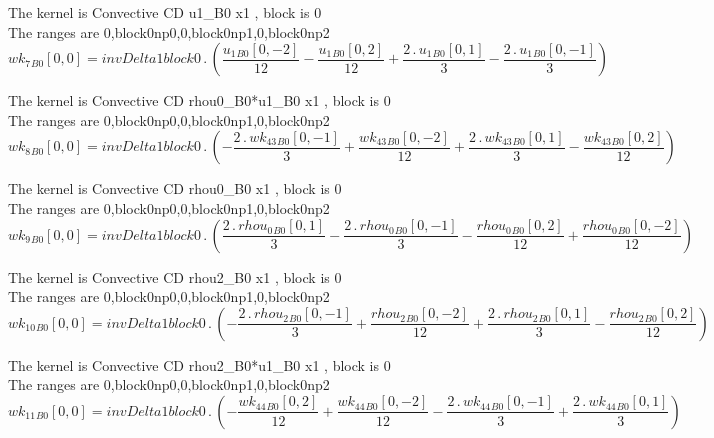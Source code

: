 \documentclass{article}
\begin{document}
\noindent The kernel is Convective CD u1_B0 x1 , block is 0\\\noindent The ranges are 0,block0np0,0,block0np1,0,block0np2\\\begin{dmath}{wk_{7}{_{B0}}}[{0,0}] = invDelta1block0 \,.\, \left(\frac{{u_{1}{_{B0}}}[{0,-2}]}{12} - \frac{{u_{1}{_{B0}}}[{0,2}]}{12} + \frac{2 \,.\, {u_{1}{_{B0}}}[{0,1}]}{3} - \frac{2 \,.\, {u_{1}{_{B0}}}[{0,-1}]}{3}\right)\end{dmath}

\noindent The kernel is Convective CD rhou0_B0*u1_B0 x1 , block is 0\\\noindent The ranges are 0,block0np0,0,block0np1,0,block0np2\\\begin{dmath}{wk_{8}{_{B0}}}[{0,0}] = invDelta1block0 \,.\, \left(- \frac{2 \,.\, {wk_{43}{_{B0}}}[{0,-1}]}{3} + \frac{{wk_{43}{_{B0}}}[{0,-2}]}{12} + \frac{2 \,.\, {wk_{43}{_{B0}}}[{0,1}]}{3} - \frac{{wk_{43}{_{B0}}}[{0,2}]}{12}\right)\end{dmath}

\noindent The kernel is Convective CD rhou0_B0 x1 , block is 0\\\noindent The ranges are 0,block0np0,0,block0np1,0,block0np2\\\begin{dmath}{wk_{9}{_{B0}}}[{0,0}] = invDelta1block0 \,.\, \left(\frac{2 \,.\, {rhou_{0}{_{B0}}}[{0,1}]}{3} - \frac{2 \,.\, {rhou_{0}{_{B0}}}[{0,-1}]}{3} - \frac{{rhou_{0}{_{B0}}}[{0,2}]}{12} + \frac{{rhou_{0}{_{B0}}}[{0,-2}]}{12}\right)\end{dmath}

\noindent The kernel is Convective CD rhou2_B0 x1 , block is 0\\\noindent The ranges are 0,block0np0,0,block0np1,0,block0np2\\\begin{dmath}{wk_{10}{_{B0}}}[{0,0}] = invDelta1block0 \,.\, \left(- \frac{2 \,.\, {rhou_{2}{_{B0}}}[{0,-1}]}{3} + \frac{{rhou_{2}{_{B0}}}[{0,-2}]}{12} + \frac{2 \,.\, {rhou_{2}{_{B0}}}[{0,1}]}{3} - 
\frac{{rhou_{2}{_{B0}}}[{0,2}]}{12}\right)\end{dmath}

\noindent The kernel is Convective CD rhou2_B0*u1_B0 x1 , block is 0\\\noindent The ranges are 0,block0np0,0,block0np1,0,block0np2\\\begin{dmath}{wk_{11}{_{B0}}}[{0,0}] = invDelta1block0 \,.\, \left(- \frac{{wk_{44}{_{B0}}}[{0,2}]}{12} + \frac{{wk_{44}{_{B0}}}[{0,-2}]}{12} - \frac{2 \,.\, {wk_{44}{_{B0}}}[{0,-1}]}{3} + \frac{2 \,.\, {wk_{44}{_{B0}}}[{0,1}]}{3}\right)\end{dmath}
\end{document}
